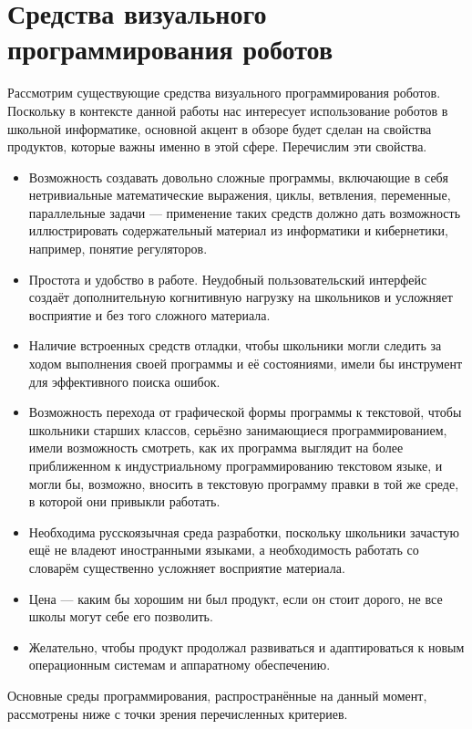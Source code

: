 \documentclass[a4paper]{article}
\begin{document}
\section{Средства визуального программирования роботов}
Рассмотрим существующие средства визуального программирования роботов. Поскольку в контексте данной работы нас интересует использование роботов в школьной информатике, основной акцент в обзоре будет сделан на свойства продуктов, которые важны именно в этой сфере. Перечислим эти свойства.
\begin{itemize}
  \item Возможность создавать довольно сложные программы, включающие в себя нетривиальные математические выражения, циклы, ветвления, переменные, параллельные задачи --- применение таких средств должно дать возможность иллюстрировать содержательный материал из информатики и кибернетики, например, понятие регуляторов.
  \item Простота и удобство в работе. Неудобный пользовательский интерфейс создаёт дополнительную когнитивную нагрузку на школьников и усложняет восприятие и без того сложного материала.
  \item Наличие встроенных средств отладки, чтобы школьники могли следить за ходом выполнения своей программы и её состояниями, имели бы инструмент для эффективного поиска ошибок.
  \item Возможность перехода от графической формы программы к текстовой, чтобы школьники старших классов, серьёзно занимающиеся программированием, имели возможность смотреть, как их программа выглядит на более приближенном к индустриальному программированию текстовом языке, и могли бы, возможно, вносить в текстовую программу правки в той же среде, в которой они привыкли работать.
  \item Необходима русскоязычная среда разработки, поскольку школьники зачастую ещё не владеют иностранными языками, а необходимость работать со словарём существенно усложняет восприятие материала.
  \item Цена --- каким бы хорошим ни был продукт, если он стоит дорого, не все школы могут себе его позволить.
  \item Желательно, чтобы продукт продолжал развиваться и адаптироваться к новым операционным системам и аппаратному обеспечению.
\end{itemize}
Основные среды программирования, распространённые на данный момент, рассмотрены ниже с точки зрения перечисленных критериев.
\end{document}

